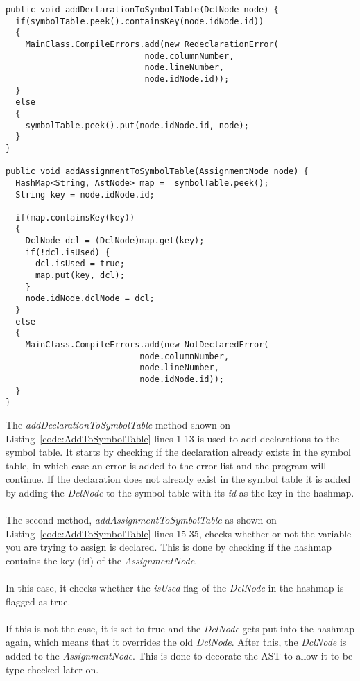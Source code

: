 \begin{lstlisting}[caption={Code to add declaration to the symbol table},label={code:AddToSymbolTable}]
public void addDeclarationToSymbolTable(DclNode node) {
  if(symbolTable.peek().containsKey(node.idNode.id))
  {
    MainClass.CompileErrors.add(new RedeclarationError(
                            node.columnNumber, 
                            node.lineNumber, 
                            node.idNode.id));
  }
  else
  {
    symbolTable.peek().put(node.idNode.id, node);
  }
}

public void addAssignmentToSymbolTable(AssignmentNode node) {
  HashMap<String, AstNode> map =  symbolTable.peek();
  String key = node.idNode.id;
		
  if(map.containsKey(key))
  {
    DclNode dcl = (DclNode)map.get(key);
    if(!dcl.isUsed) {
      dcl.isUsed = true;
      map.put(key, dcl);
    }
    node.idNode.dclNode = dcl;
  }
  else
  {
    MainClass.CompileErrors.add(new NotDeclaredError(
                           node.columnNumber, 
                           node.lineNumber, 
                           node.idNode.id));
  }
}
\end{lstlisting}
The \textit{addDeclarationToSymbolTable} method shown on Listing~\ref{code:AddToSymbolTable} lines 1-13 is used to add declarations to the symbol table. 
It starts by checking if the declaration already exists in the symbol table, in which case an error is added to the error list and the program will continue. 
If the declaration does not already exist in the symbol table it is added by adding the \textit{DclNode} to the symbol table with its \textit{id} as the key in the hashmap.
\\\\
The second method, \textit{addAssignmentToSymbolTable} as shown on Listing~\ref{code:AddToSymbolTable} lines 15-35, checks whether or not the variable you are trying to assign is declared. 
This is done by checking if the hashmap contains the key (id) of the \textit{AssignmentNode}. 
\\\\
In this case, it checks whether the \textit{isUsed} flag of the \textit{DclNode} in the hashmap is flagged as true.
\\\\
If this is not the case, it is set to true and the \textit{DclNode} gets put into the hashmap again, which means that it overrides the old \textit{DclNode}. 
After this, the \textit{DclNode} is added to the \textit{AssignmentNode}. This is done to decorate the AST to allow it to be type checked later on.
